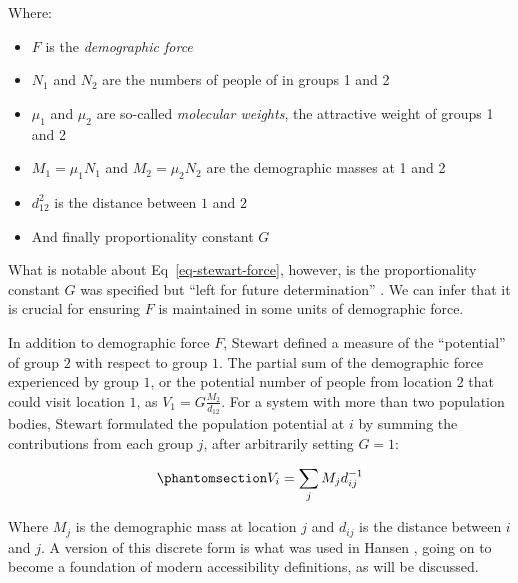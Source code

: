 \documentclass[
  10pt,
  letterpaper,
]{article}
\providecommand{\tightlist}{%
  \setlength{\itemsep}{0pt}\setlength{\parskip}{0pt}}\usepackage{longtable,booktabs,array}
\begin{document}
\noindent Where:

\begin{itemize}
\tightlist
\item
  \(F\) is the \emph{demographic force}
\item
  \(N_1\) and \(N_2\) are the numbers of people of in groups 1 and 2
\item
  \(\mu_1\) and \(\mu_2\) are so-called \emph{molecular weights}, the
  attractive weight of groups 1 and 2
\item
  \(M_1 = \mu_1N_1\) and \(M_2 = \mu_2N_2\) are the demographic masses
  at 1 and 2
\item
  \(d_{12}^2\) is the distance between \(1\) and \(2\)
\item
  And finally proportionality constant \(G\)
\end{itemize}

What is notable about Eq~\ref{eq-stewart-force}, however, is the
proportionality constant \(G\) was specified but ``left for future
determination''
\citep[p.~34]{stewartDemographicGravitationEvidence1948}. We can infer
that it is crucial for ensuring \(F\) is maintained in some units of
demographic force.

In addition to demographic force \(F\), Stewart defined a measure of the
``potential'' of group \(2\) with respect to group \(1\). The partial
sum of the demographic force experienced by group \(1\), or the
potential number of people from location \(2\) that could visit location
\(1\), as \(V_1 = G\frac{M_2}{d_{12}}\). For a system with more than two
population bodies, Stewart formulated the population potential at \(i\)
by summing the contributions from each group \(j\), after arbitrarily
setting \(G=1\):

\begin{equation}\phantomsection\label{eq-stewart-population-potential-sum}{
V_i = \sum_j M_jd_{ij}^{-1}
}\end{equation}

\noindent Where \(M_j\) is the demographic mass at location \(j\) and
\(d_{ij}\) is the distance between \(i\) and \(j\). A version of this
discrete form is what was used in Hansen \citep{hansen1959}, going on to
become a foundation of modern accessibility definitions, as will be
discussed.
\end{document}
